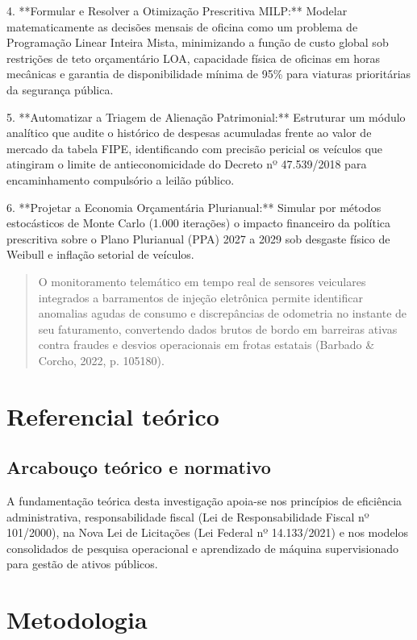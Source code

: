 \documentclass[12pt,a4paper]{article}
\begin{document}
4. **Formular e Resolver a Otimização Prescritiva MILP:** Modelar matematicamente as decisões mensais de oficina como um problema de Programação Linear Inteira Mista, minimizando a função de custo global sob restrições de teto orçamentário LOA, capacidade física de oficinas em horas mecânicas e garantia de disponibilidade mínima de 95\% para viaturas prioritárias da segurança pública.

5. **Automatizar a Triagem de Alienação Patrimonial:** Estruturar um módulo analítico que audite o histórico de despesas acumuladas frente ao valor de mercado da tabela FIPE, identificando com precisão pericial os veículos que atingiram o limite de antieconomicidade do Decreto nº 47.539/2018 para encaminhamento compulsório a leilão público.

6. **Projetar a Economia Orçamentária Plurianual:** Simular por métodos estocásticos de Monte Carlo (1.000 iterações) o impacto financeiro da política prescritiva sobre o Plano Plurianual (PPA) 2027 a 2029 sob desgaste físico de Weibull e inflação setorial de veículos.

\begin{quote}
\small O monitoramento telemático em tempo real de sensores veiculares integrados a barramentos de injeção eletrônica permite identificar anomalias agudas de consumo e discrepâncias de odometria no instante de seu faturamento, convertendo dados brutos de bordo em barreiras ativas contra fraudes e desvios operacionais em frotas estatais (Barbado \& Corcho, 2022, p. 105180).
\end{quote}


\section{Referencial teórico}


\subsection{Arcabouço teórico e normativo}

A fundamentação teórica desta investigação apoia-se nos princípios de eficiência administrativa, responsabilidade fiscal (Lei de Responsabilidade Fiscal nº 101/2000), na Nova Lei de Licitações (Lei Federal nº 14.133/2021) e nos modelos consolidados de pesquisa operacional e aprendizado de máquina supervisionado para gestão de ativos públicos.


\section{Metodologia}
\end{document}
